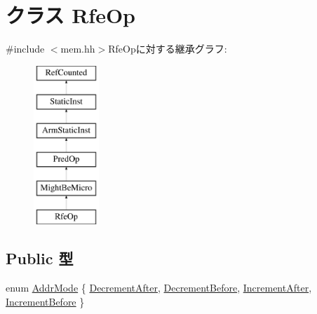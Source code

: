 \hypertarget{classArmISA_1_1RfeOp}{
\section{クラス RfeOp}
\label{classArmISA_1_1RfeOp}
}


{\ttfamily \#include $<$mem.hh$>$}RfeOpに対する継承グラフ:\begin{figure}[H]
\begin{center}
\leavevmode
\includegraphics[height=6cm]{classArmISA_1_1RfeOp}
\end{center}
\end{figure}
\subsection*{Public 型}
\begin{DoxyCompactItemize}
\item 
enum \hyperlink{classArmISA_1_1RfeOp_abf132b4ad93f3557cd3956577592ba68}{AddrMode} \{ \hyperlink{classArmISA_1_1RfeOp_abf132b4ad93f3557cd3956577592ba68a35a911245d73ba52065231cd0456ad9a}{DecrementAfter}, 
\hyperlink{classArmISA_1_1RfeOp_abf132b4ad93f3557cd3956577592ba68a4125a924b4656b5ef64eeb64874c081b}{DecrementBefore}, 
\hyperlink{classArmISA_1_1RfeOp_abf132b4ad93f3557cd3956577592ba68ac45778ec698a20485fe262a5b7f8b96e}{IncrementAfter}, 
\hyperlink{classArmISA_1_1RfeOp_abf132b4ad93f3557cd3956577592ba68adad42d0d2a9ba8285c2e852716985e19}{IncrementBefore}
 \}
\end{DoxyCompactItemize}
